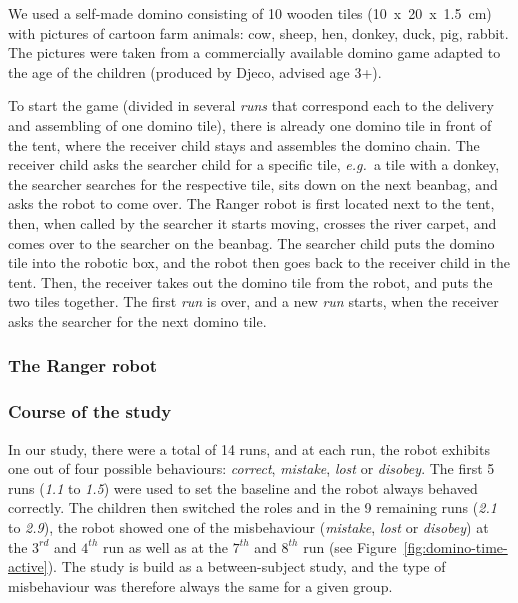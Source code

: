 \documentclass{sig-alternate}
\newcommand{\eg}{{\textit{e.g.~}}}
\begin{document}
We used a self-made domino consisting of 10 wooden tiles (10~x~20~x~1.5~cm) with
pictures of cartoon farm animals: cow, sheep, hen, donkey, duck, pig, rabbit.
The pictures were taken from a commercially available domino game adapted to the
age of the children (produced by Djeco, advised age 3+). 

To start the game (divided in several \emph{runs} that correspond each to the
delivery and assembling of one domino tile), there is already one domino tile in
front of the tent, where the receiver child stays and assembles the domino
chain. The receiver child asks the searcher child for a specific tile, \eg a
tile with a donkey, the searcher searches for the respective tile, sits down on
the next beanbag, and asks the robot to come over.  The Ranger robot is first
located next to the tent, then, when called by the searcher it starts moving,
crosses the river carpet, and comes over to the searcher on the beanbag. The
searcher child puts the domino tile into the robotic box, and the robot then
goes back to the receiver child in the tent. Then, the receiver takes out the
domino tile from the robot, and puts the two tiles together. The first
\emph{run} is over, and a new \emph{run} starts, when the receiver asks the
searcher for the next domino tile.

\subsubsection{The Ranger robot}

\subsubsection{Course of the study}

In our study, there were a total of 14 runs, and at each run, the robot exhibits
one out of four possible behaviours: \emph{correct}, \emph{mistake}, \emph{lost}
or \emph{disobey}.  The first 5 runs (\emph{1.1} to \emph{1.5}) were used to set
the baseline and the robot always behaved correctly. The children then switched
the roles and in the 9 remaining runs (\emph{2.1} to \emph{2.9}), the robot
showed one of the misbehaviour (\emph{mistake}, \emph{lost} or \emph{disobey})
at the $3^{rd}$ and $4^{th}$ run as well as at the $7^{th}$ and $8^{th}$ run
(see Figure~\ref{fig:domino-time-active}). The study is build as a
between-subject study, and the type of misbehaviour was therefore always the
same for a given group.
\end{document}
